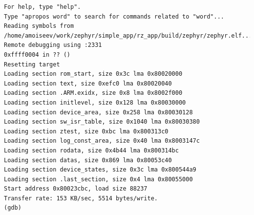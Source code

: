 \documentclass[11pt,a4paper,oneside]{article}
\begin{document}
\begin{lstlisting}
For help, type "help".
Type "apropos word" to search for commands related to "word"...
Reading symbols from
/home/amoiseev/work/zephyr/simple_app/rz_app/build/zephyr/zephyr.elf...
Remote debugging using :2331
0xffff0004 in ?? ()
Resetting target
Loading section rom_start, size 0x3c lma 0x80020000
Loading section text, size 0xefc0 lma 0x80020040
Loading section .ARM.exidx, size 0x8 lma 0x8002f000
Loading section initlevel, size 0x128 lma 0x80030000
Loading section device_area, size 0x258 lma 0x80030128
Loading section sw_isr_table, size 0x1040 lma 0x80030380
Loading section ztest, size 0xbc lma 0x800313c0
Loading section log_const_area, size 0x40 lma 0x8003147c
Loading section rodata, size 0x4b44 lma 0x800314bc
Loading section datas, size 0x869 lma 0x80053c40
Loading section device_states, size 0x3c lma 0x800544a9
Loading section .last_section, size 0x4 lma 0x80055000
Start address 0x80023cbc, load size 88237
Transfer rate: 153 KB/sec, 5514 bytes/write.
(gdb)
\end{lstlisting}
\end{document}
